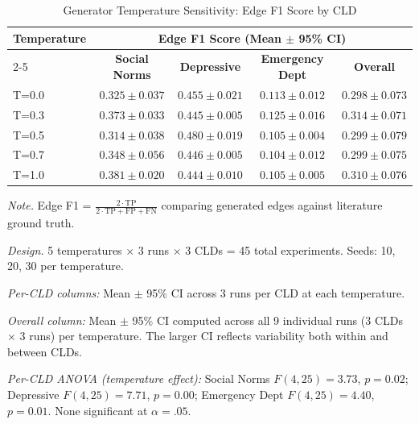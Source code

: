 \begin{table}[H]
\centering
\caption{Generator Temperature Sensitivity: Edge F1 Score by CLD}
\label{tab:temperature_sensitivity}
\begin{threeparttable}
\begin{tabular}{lcccc}
\toprule
\textbf{Temperature} & \multicolumn{4}{c}{\textbf{Edge F1 Score (Mean $\pm$ 95\% CI)}} \\
\cmidrule(lr){2-5}
 & \textbf{Social Norms} & \textbf{Depressive} & \textbf{Emergency Dept} & \textbf{Overall} \\
\midrule
T=0.0 & $0.325 \pm 0.037$ & $0.455 \pm 0.021$ & $0.113 \pm 0.012$ & $0.298 \pm 0.073$ \\
T=0.3 & $0.373 \pm 0.033$ & $0.445 \pm 0.005$ & $0.125 \pm 0.016$ & $0.314 \pm 0.071$ \\
T=0.5 & $0.314 \pm 0.038$ & $0.480 \pm 0.019$ & $0.105 \pm 0.004$ & $0.299 \pm 0.079$ \\
T=0.7 & $0.348 \pm 0.056$ & $0.446 \pm 0.005$ & $0.104 \pm 0.012$ & $0.299 \pm 0.075$ \\
T=1.0 & $0.381 \pm 0.020$ & $0.444 \pm 0.010$ & $0.105 \pm 0.005$ & $0.310 \pm 0.076$ \\
\bottomrule
\end{tabular}
\begin{tablenotes}
\small
\item \textit{Note.} Edge F1 = $\frac{2 \cdot \text{TP}}{2 \cdot \text{TP} + \text{FP} + \text{FN}}$ comparing generated edges against literature ground truth.
\item \textit{Design.} 5 temperatures $\times$ 3 runs $\times$ 3 CLDs = 45 total experiments. Seeds: 10, 20, 30 per temperature.
\item \textit{Per-CLD columns:} Mean $\pm$ 95\% CI across 3 runs per CLD at each temperature.
\item \textit{Overall column:} Mean $\pm$ 95\% CI computed across all 9 individual runs (3 CLDs $\times$ 3 runs) per temperature. The larger CI reflects variability both within and between CLDs.
\item \textit{Per-CLD ANOVA (temperature effect):} Social Norms $F(4,25)=3.73$, $p=0.02$; Depressive $F(4,25)=7.71$, $p=0.00$; Emergency Dept $F(4,25)=4.40$, $p=0.01$. None significant at $\alpha=.05$.
\end{tablenotes}
\end{threeparttable}
\end{table}